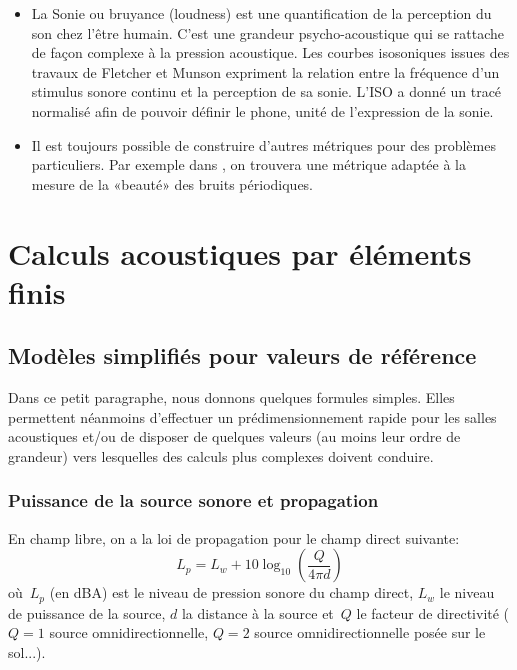 \begin{itemize}
   \item La Sonie ou bruyance (loudness) est une quantification de la perception du son chez l'être humain. C'est une grandeur psycho-acoustique qui se rattache de façon complexe à la pression acoustique. Les courbes isosoniques issues des travaux de Fletcher et Munson %
   expriment la relation entre la fréquence d'un stimulus sonore continu et la perception de sa sonie. L'ISO a donné un tracé normalisé afin de pouvoir définir le phone, unité de l'expression de la sonie.

   \item Il est toujours possible de construire d'autres métriques pour des problèmes particuliers. Par exemple dans \cite{bib-VM-suav}, on trouvera une métrique adaptée à la mesure de la «beauté» des bruits périodiques.
\end{itemize}

\medskip
\section{Calculs acoustiques par éléments finis}\label{Sec-AcouMEF}

\medskip
\subsection{Modèles simplifiés pour valeurs de référence}

Dans ce petit paragraphe, nous donnons quelques formules simples.
Elles permettent néanmoins d'effectuer un prédimensionnement rapide pour les salles acoustiques et/ou de disposer de quelques valeurs (au moins leur ordre de grandeur) vers lesquelles des calculs plus complexes doivent conduire.

\medskip
\subsubsection{Puissance de la source sonore et propagation}

En champ libre, on a la loi de propagation pour le champ direct suivante:
\begin{equation}
L_p=L_w+10\log_{10}\left(\dfrac{Q}{4\pi d}\right)
\end{equation}
où~$L_p$ (en dBA) est le niveau de pression sonore du champ direct, $L_w$ le niveau de puissance de la source, $d$ la distance à la source et~$Q$ le facteur de directivité ($Q=1$ source omnidirectionnelle, $Q=2$ source omnidirectionnelle posée sur le sol...).

